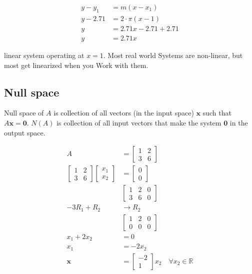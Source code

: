 \documentclass[main.tex]{subfiles}
\begin{document}
$$
\begin{aligned}
y-y_{1} &= m\left(x-x_{1}\right) \\
y-2.71 &= 2 \cdot \pi(x-1) \\
y &= 2.71 x-2.71+2.71 \\
y &= 2.71 x
\end{aligned}
$$

linear system operating at $x=1$. Most real world Systems are non-linear, but most get linearized when you Work with them.

\subsection{Null space}

Null space of $A$ is collection of all vectors (in the input space) $\bm{x}$ such that $A \bm{x}=\bm{0}$. $N(A)$ is collection of all input vectors that make the system $\bm{0}$ in the output space.

$$
\begin{aligned}
A&=\left[\begin{array}{ll}
1 & 2 \\
3 & 6
\end{array}\right]\\
\left[\begin{array}{ll}
1 & 2 \\
3 & 6
\end{array}\right]\left[\begin{array}{l}
x_{1} \\
x_{2}
\end{array}\right]&=\left[\begin{array}{l}
0 \\
0
\end{array}\right]\\
&\left[\begin{array}{ll|l}1 & 2 & 0 \\ 3 & 6 & 0\end{array}\right]\\
-3 R_{1}+R_{2} &\rightarrow R_{2} \\
&\left[\begin{array}{ll|l}
1 & 2 & 0 \\
0 & 0 & 0
\end{array}\right]\\
x_{1}+2 x_{2} &=0 \\
x_{1} &= -2 x_{2} \\
\bm{x}&=\left[\begin{array}{c}
-2 \\
1
\end{array}\right] x_{2} \quad \forall x_{2} \in \mathbb{R}
\end{aligned}
$$
\end{document}
